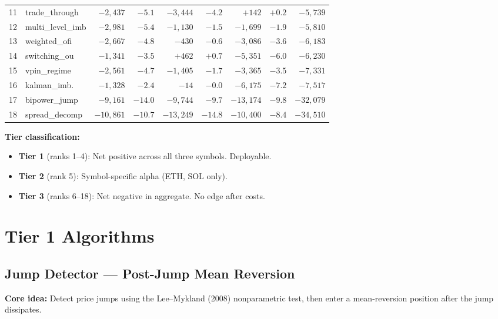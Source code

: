 \documentclass[11pt,a4paper]{article}
\newcommand{\bottomrule}{\hline\hline}
\begin{document}
\begin{table}[h!]
\begin{tabular}{@{}rlrrrrrrr@{}}
11 & trade\_through & $-2{,}437$ & $-5.1$ & $-3{,}444$ & $-4.2$ & $+142$ & $+0.2$ & $-5{,}739$ \\
12 & multi\_level\_imb & $-2{,}981$ & $-5.4$ & $-1{,}130$ & $-1.5$ & $-1{,}699$ & $-1.9$ & $-5{,}810$ \\
13 & weighted\_ofi & $-2{,}667$ & $-4.8$ & $-430$ & $-0.6$ & $-3{,}086$ & $-3.6$ & $-6{,}183$ \\
14 & switching\_ou & $-1{,}341$ & $-3.5$ & $+462$ & $+0.7$ & $-5{,}351$ & $-6.0$ & $-6{,}230$ \\
15 & vpin\_regime & $-2{,}561$ & $-4.7$ & $-1{,}405$ & $-1.7$ & $-3{,}365$ & $-3.5$ & $-7{,}331$ \\
16 & kalman\_imb. & $-1{,}328$ & $-2.4$ & $-14$ & $-0.0$ & $-6{,}175$ & $-7.2$ & $-7{,}517$ \\
17 & bipower\_jump & $-9{,}161$ & $-14.0$ & $-9{,}744$ & $-9.7$ & $-13{,}174$ & $-9.8$ & $-32{,}079$ \\
18 & spread\_decomp & $-10{,}861$ & $-10.7$ & $-13{,}249$ & $-14.8$ & $-10{,}400$ & $-8.4$ & $-34{,}510$ \\
\bottomrule
\end{tabular}
\end{table}

\textbf{Tier classification:}
\begin{itemize}
    \item \textbf{Tier 1} (ranks 1--4): Net positive across all three symbols. Deployable.
    \item \textbf{Tier 2} (rank 5): Symbol-specific alpha (ETH, SOL only).
    \item \textbf{Tier 3} (ranks 6--18): Net negative in aggregate. No edge after costs.
\end{itemize}

\section{Tier 1 Algorithms}

\subsection{Jump Detector --- Post-Jump Mean Reversion}

\textbf{Core idea:} Detect price jumps using the Lee--Mykland (2008) nonparametric test, then enter a mean-reversion position after the jump dissipates.
\end{document}
